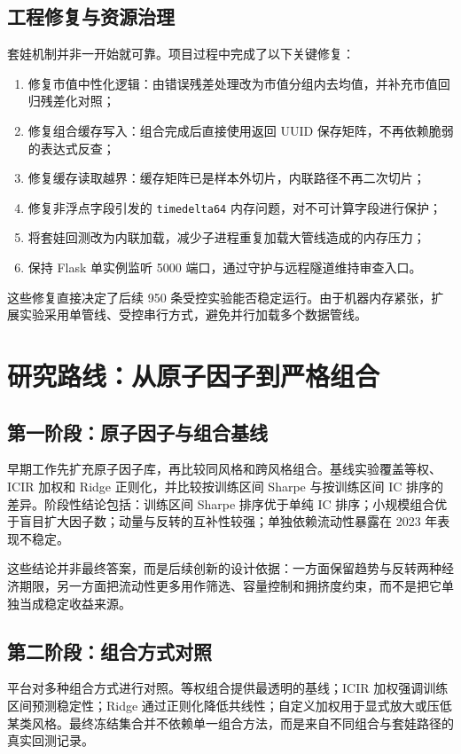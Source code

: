 \documentclass[10pt,a4paper]{article}
\begin{document}
\subsection{工程修复与资源治理}
套娃机制并非一开始就可靠。项目过程中完成了以下关键修复：
\begin{enumerate}
  \item 修复市值中性化逻辑：由错误残差处理改为市值分组内去均值，并补充市值回归残差化对照；
  \item 修复组合缓存写入：组合完成后直接使用返回 UUID 保存矩阵，不再依赖脆弱的表达式反查；
  \item 修复缓存读取越界：缓存矩阵已是样本外切片，内联路径不再二次切片；
  \item 修复非浮点字段引发的 \texttt{timedelta64} 内存问题，对不可计算字段进行保护；
  \item 将套娃回测改为内联加载，减少子进程重复加载大管线造成的内存压力；
  \item 保持 Flask 单实例监听 5000 端口，通过守护与远程隧道维持审查入口。
\end{enumerate}
这些修复直接决定了后续 950 条受控实验能否稳定运行。由于机器内存紧张，扩展实验采用单管线、受控串行方式，避免并行加载多个数据管线。

\section{研究路线：从原子因子到严格组合}
\subsection{第一阶段：原子因子与组合基线}
早期工作先扩充原子因子库，再比较同风格和跨风格组合。基线实验覆盖等权、ICIR 加权和 Ridge 正则化，并比较按训练区间 Sharpe 与按训练区间 IC 排序的差异。阶段性结论包括：训练区间 Sharpe 排序优于单纯 IC 排序；小规模组合优于盲目扩大因子数；动量与反转的互补性较强；单独依赖流动性暴露在 2023 年表现不稳定。

这些结论并非最终答案，而是后续创新的设计依据：一方面保留趋势与反转两种经济期限，另一方面把流动性更多用作筛选、容量控制和拥挤度约束，而不是把它单独当成稳定收益来源。

\subsection{第二阶段：组合方式对照}
平台对多种组合方式进行对照。等权组合提供最透明的基线；ICIR 加权强调训练区间预测稳定性；Ridge 通过正则化降低共线性；自定义加权用于显式放大或压低某类风格。最终冻结集合并不依赖单一组合方法，而是来自不同组合与套娃路径的真实回测记录。
\end{document}
